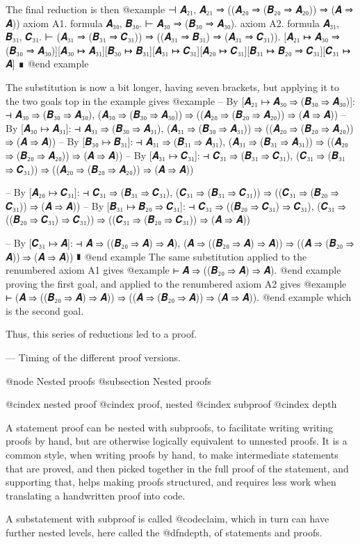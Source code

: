 The final reduction is then
@example
 ⊣ 𝑨₂₁, 𝑨₂₁ ⇒ ((𝑨₂₀ ⇒ (𝑩₂₀ ⇒ 𝑨₂₀)) ⇒ (𝑨 ⇒ 𝑨))
axiom A1. formula 𝑨₃₀, 𝑩₃₀.
  ⊢ 𝑨₃₀ ⇒ (𝑩₃₀ ⇒ 𝑨₃₀).
axiom A2. formula 𝑨₃₁, 𝑩₃₁, 𝑪₃₁.
  ⊢ (𝑨₃₁ ⇒ (𝑩₃₁ ⇒ 𝑪₃₁)) ⇒ ((𝑨₃₁ ⇒ 𝑩₃₁) ⇒ (𝑨₃₁ ⇒ 𝑪₃₁)).
[𝑨₂₁ ↦ 𝑨₃₀ ⇒ (𝑩₃₀ ⇒ 𝑨₃₀)][𝑨₃₀ ↦ 𝑨₃₁][𝑩₃₀ ↦ 𝑩₃₁][𝑨₃₁ ↦ 𝑪₃₁][𝑨₂₀ ↦ 𝑪₃₁][𝑩₃₁ ↦ 𝑩₂₀ ⇒ 𝑪₃₁][𝑪₃₁ ↦ 𝑨]
∎
@end example

The substitution is now a bit longer, having seven brackets, but applying it to the two goals top in the example gives
@example
-- By [𝑨₂₁ ↦ 𝑨₃₀ ⇒ (𝑩₃₀ ⇒ 𝑨₃₀)]:
 ⊣ 𝑨₃₀ ⇒ (𝑩₃₀ ⇒ 𝑨₃₀), (𝑨₃₀ ⇒ (𝑩₃₀ ⇒ 𝑨₃₀)) ⇒ ((𝑨₂₀ ⇒ (𝑩₂₀ ⇒ 𝑨₂₀)) ⇒ (𝑨 ⇒ 𝑨))
-- By [𝑨₃₀ ↦ 𝑨₃₁]:
 ⊣ 𝑨₃₁ ⇒ (𝑩₃₀ ⇒ 𝑨₃₁), (𝑨₃₁ ⇒ (𝑩₃₀ ⇒ 𝑨₃₁)) ⇒ ((𝑨₂₀ ⇒ (𝑩₂₀ ⇒ 𝑨₂₀)) ⇒ (𝑨 ⇒ 𝑨))
-- By [𝑩₃₀ ↦ 𝑩₃₁]:
 ⊣ 𝑨₃₁ ⇒ (𝑩₃₁ ⇒ 𝑨₃₁), (𝑨₃₁ ⇒ (𝑩₃₁ ⇒ 𝑨₃₁)) ⇒ ((𝑨₂₀ ⇒ (𝑩₂₀ ⇒ 𝑨₂₀)) ⇒ (𝑨 ⇒ 𝑨))
-- By [𝑨₃₁ ↦ 𝑪₃₁]:
 ⊣ 𝑪₃₁ ⇒ (𝑩₃₁ ⇒ 𝑪₃₁), (𝑪₃₁ ⇒ (𝑩₃₁ ⇒ 𝑪₃₁)) ⇒ ((𝑨₂₀ ⇒ (𝑩₂₀ ⇒ 𝑨₂₀)) ⇒ (𝑨 ⇒ 𝑨))

-- By [𝑨₂₀ ↦ 𝑪₃₁]:
 ⊣ 𝑪₃₁ ⇒ (𝑩₃₁ ⇒ 𝑪₃₁), (𝑪₃₁ ⇒ (𝑩₃₁ ⇒ 𝑪₃₁)) ⇒ ((𝑪₃₁ ⇒ (𝑩₂₀ ⇒ 𝑪₃₁)) ⇒ (𝑨 ⇒ 𝑨))
-- By [𝑩₃₁ ↦ 𝑩₂₀ ⇒ 𝑪₃₁]:
 ⊣ 𝑪₃₁ ⇒ ((𝑩₂₀ ⇒ 𝑪₃₁) ⇒ 𝑪₃₁), (𝑪₃₁ ⇒ ((𝑩₂₀ ⇒ 𝑪₃₁) ⇒ 𝑪₃₁)) ⇒ ((𝑪₃₁ ⇒ (𝑩₂₀ ⇒ 𝑪₃₁)) ⇒ (𝑨 ⇒ 𝑨))

-- By [𝑪₃₁ ↦ 𝑨]:
 ⊣ 𝑨 ⇒ ((𝑩₂₀ ⇒ 𝑨) ⇒ 𝑨), (𝑨 ⇒ ((𝑩₂₀ ⇒ 𝑨) ⇒ 𝑨)) ⇒ ((𝑨 ⇒ (𝑩₂₀ ⇒ 𝑨)) ⇒ (𝑨 ⇒ 𝑨))
∎
@end example
The same substitution applied to the renumbered axiom A1 gives
@example
  ⊢ 𝑨 ⇒ ((𝑩₂₀ ⇒ 𝑨) ⇒ 𝑨).
@end example
proving the first goal, and applied to the renumbered axiom A2 gives
@example
  ⊢ (𝑨 ⇒ ((𝑩₂₀ ⇒ 𝑨) ⇒ 𝑨)) ⇒ ((𝑨 ⇒ (𝑩₂₀ ⇒ 𝑨)) ⇒ (𝑨 ⇒ 𝑨)).
@end example
which is the second goal.

Thus, this series of reductions led to a proof.

— Timing of the different proof versions.


@node Nested proofs
@subsection Nested proofs

@cindex nested proof
@cindex proof, nested
@cindex subproof
@cindex depth

A statement proof can be nested with subproofs, to facilitate writing writing proofs by hand, but are otherwise logically equivalent to unnested proofs. It is a common style, when writing proofs by hand, to make intermediate statements that are proved, and then picked together in the full proof of the statement, and supporting that, helps making proofs structured, and requires less work when translating a handwritten proof into code.

A substatement with subproof is called @code{claim}, which in turn can have further nested levels, here called the @dfn{depth}, of statements and proofs.



